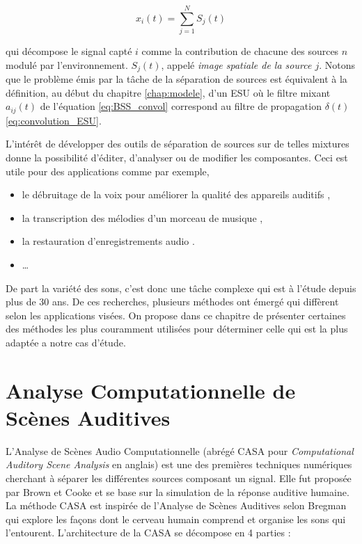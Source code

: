 \begin{equation}
x_i(t) = \sum_{j = 1}^{N}S_j(t)
\end{equation}


qui décompose le signal capté $i$ comme la contribution de chacune des sources $n$ modulé par l'environnement. $S_j(t)$, appelé \textit{image spatiale de la source $j$}. 
Notons que le problème émis par la tâche de la séparation de sources est équivalent à la définition, au début du chapitre \ref{chap:modele}, d'un ESU où le filtre mixant $a_{ij}(t)$ de l'équation \ref{eq:BSS_convol} correspond au filtre de propagation $\delta(t)$ \ref{eq:convolution_ESU}. 

L'intérêt de développer des outils de séparation de sources sur de telles mixtures donne la possibilité d'éditer, d'analyser ou de modifier les composantes. Ceci est utile pour des applications comme par exemple,

\begin{itemize}
\item le débruitage de la voix pour améliorer la qualité des appareils auditifs \cite{gannot2017consolidated},
\item la transcription des mélodies d'un morceau de musique \cite{vincent2006musical},
\item la restauration d'enregistrements audio \cite{canadas2016constrained}.
\item \dots
\end{itemize}

De part la variété des sons, c'est donc une tâche complexe qui est à l'étude depuis plus de 30 ans. De ces recherches, plusieurs méthodes ont émergé qui diffèrent selon les applications visées. On propose dans ce chapitre de présenter certaines des méthodes les plus couramment utilisées pour déterminer celle qui est la plus adaptée a notre cas d'étude.

\section{Analyse Computationnelle de Scènes Auditives }

L'Analyse de Scènes Audio Computationnelle (abrégé CASA pour \textit{Computational Auditory Scene Analysis} en anglais) est une des premières techniques numériques cherchant à séparer les différentes sources composant un signal. Elle fut proposée par Brown et Cooke \cite{brown1994computational} et se base sur la simulation de la réponse auditive humaine.
La méthode CASA est inspirée de l'Analyse de Scènes Auditives selon Bregman \cite{bregman1994auditory} qui explore les façons dont le cerveau humain comprend et organise les sons qui l'entourent. L'architecture de la CASA se décompose en 4 parties \cite{wang2006computational} :


